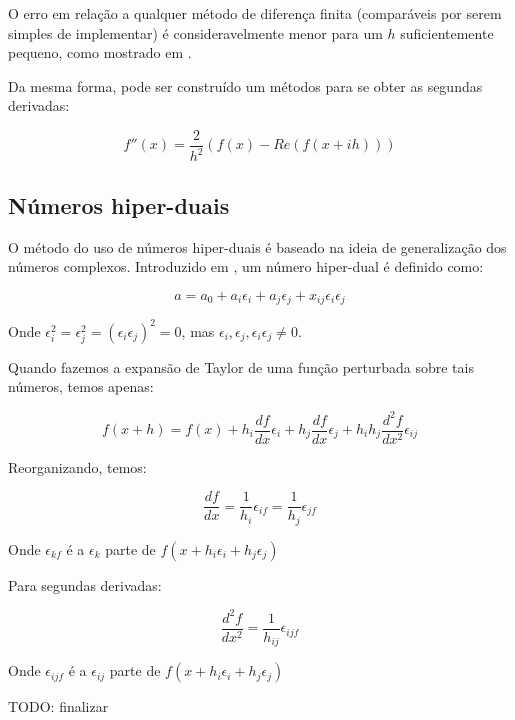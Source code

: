 O erro em relação a qualquer método de diferença finita (comparáveis por serem simples de implementar)
é consideravelmente menor para um \(h\) suficientemente pequeno, como mostrado em \cite{caplan2011numerical}.

Da mesma forma, pode ser construído um métodos para se obter as segundas derivadas:

\begin{equation*}
f''(x) = \frac{2}{h^2} (f(x) - Re(f(x+ih)))
\end{equation*}

\subsection{Números hiper-duais}
O método do uso de números hiper-duais é baseado na ideia de generalização dos números complexos.
Introduzido em \cite{Fike_2011}, um número hiper-dual é definido como:

\begin{equation*}
a = a_0 + a_i\epsilon_i + a_j\epsilon_j + x_{ij}\epsilon_i \epsilon_j
\end{equation*}

Onde \(\epsilon_i^2 = \epsilon_j^2 = (\epsilon_i\epsilon_j)^2 = 0\), mas \( \epsilon_i, \epsilon_j, \epsilon_i\epsilon_j  \neq 0\).

Quando fazemos a expansão de Taylor de uma função perturbada sobre tais números, temos apenas:

\begin{equation*}
f(x+ h) = f(x) + h_i \frac{df}{dx} \epsilon_i + h_j \frac{df}{dx} \epsilon_j +    h_ih_j \frac{d^2f}{dx^2} \epsilon_{ij}
\end{equation*}

Reorganizando, temos:

\begin{equation*}
  \frac{df}{dx} = \frac{1}{h_i} \epsilon_{if} = \frac{1}{h_j} \epsilon_{jf}
\end{equation*}


Onde \(\epsilon_{kf}\) é a \(\epsilon_k\) parte de \( f(x + h_i\epsilon_i + h_j\epsilon_j) \)

Para segundas derivadas:

\begin{equation*}
\frac{d^2f}{dx^2} = \frac{1}{h_{ij}} \epsilon_{ijf}
\end{equation*}

Onde \(\epsilon_{ijf}\) é a \(\epsilon_{ij}\) parte de \( f(x + h_i\epsilon_i + h_j\epsilon_j) \)

TODO: finalizar